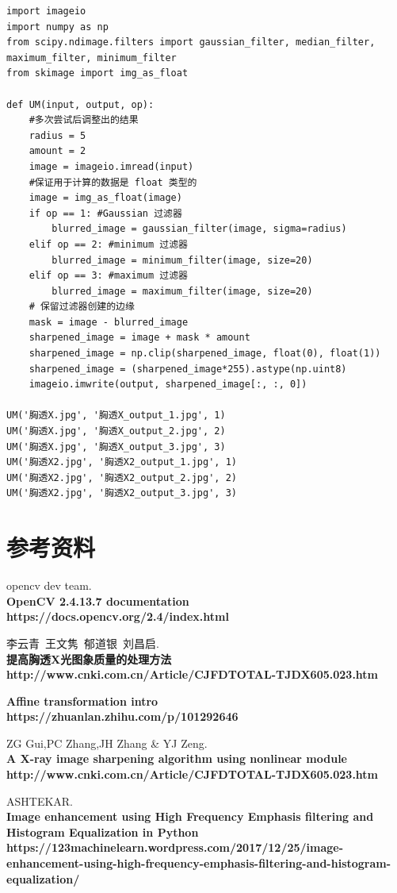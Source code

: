 \documentclass[11pt]{ctexart}
\begin{document}
\lstset{language=python}
\begin{lstlisting}
import imageio
import numpy as np
from scipy.ndimage.filters import gaussian_filter, median_filter, maximum_filter, minimum_filter
from skimage import img_as_float

def UM(input, output, op):
    #多次尝试后调整出的结果
    radius = 5
    amount = 2
    image = imageio.imread(input)
    #保证用于计算的数据是 float 类型的
    image = img_as_float(image)
    if op == 1: #Gaussian 过滤器
        blurred_image = gaussian_filter(image, sigma=radius)
    elif op == 2: #minimum 过滤器
        blurred_image = minimum_filter(image, size=20)
    elif op == 3: #maximum 过滤器
        blurred_image = maximum_filter(image, size=20)
    # 保留过滤器创建的边缘
    mask = image - blurred_image
    sharpened_image = image + mask * amount
    sharpened_image = np.clip(sharpened_image, float(0), float(1))
    sharpened_image = (sharpened_image*255).astype(np.uint8)
    imageio.imwrite(output, sharpened_image[:, :, 0])

UM('胸透X.jpg', '胸透X_output_1.jpg', 1)
UM('胸透X.jpg', '胸透X_output_2.jpg', 2)
UM('胸透X.jpg', '胸透X_output_3.jpg', 3)
UM('胸透X2.jpg', '胸透X2_output_1.jpg', 1)
UM('胸透X2.jpg', '胸透X2_output_2.jpg', 2)
UM('胸透X2.jpg', '胸透X2_output_3.jpg', 3)
\end{lstlisting}


\section{参考资料}

\begin{thebibliography}{99}

 opencv dev team.\\
{\bf OpenCV 2.4.13.7 documentation\\}
{\bf https://docs.opencv.org/2.4/index.html\\}

 李云青\ 王文隽\ 郁道银\ 刘昌启.\\
{\bf 提高胸透X光图象质量的处理方法\\}
{\bf http://www.cnki.com.cn/Article/CJFDTOTAL-TJDX605.023.htm\\}

{\bf Affine transformation intro \\}
{\bf https://zhuanlan.zhihu.com/p/101292646}

 ZG Gui,PC Zhang,JH Zhang \& YJ Zeng.\\
{\bf A X-ray image sharpening algorithm using nonlinear module\\}
{\bf http://www.cnki.com.cn/Article/CJFDTOTAL-TJDX605.023.htm\\}

 ASHTEKAR.\\
{\bf Image enhancement using High Frequency Emphasis filtering and Histogram Equalization in Python\\}
{\bf  https://123machinelearn.wordpress.com/2017/12/25/image-enhancement-using-high-frequency-emphasis-filtering-and-histogram-equalization/\\}


\end{thebibliography}
\end{document}

